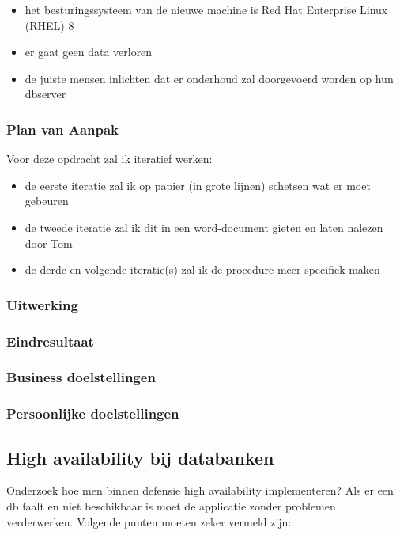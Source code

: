 \begin{itemize}
    \item het besturingssysteem van de nieuwe machine is Red Hat Enterprise Linux (RHEL) 8
    \item er gaat geen data verloren
    \item de juiste mensen inlichten dat er onderhoud zal doorgevoerd worden op hun dbserver
\end{itemize}

\subsubsection{Plan van Aanpak}

Voor deze opdracht zal ik iteratief werken:

\begin{itemize}
    \item de eerste iteratie zal ik op papier (in grote lijnen) schetsen wat er moet gebeuren
    \item de tweede iteratie zal ik dit in een word-document gieten en laten nalezen door Tom
    \item de derde en volgende iteratie(s) zal ik de procedure meer specifiek maken
\end{itemize}

\subsubsection{Uitwerking}
\subsubsection{Eindresultaat}
\subsubsection{Business doelstellingen}
\subsubsection{Persoonlijke doelstellingen}

\subsection{High availability bij databanken}


Onderzoek hoe men binnen defensie high availability implementeren? Als er een db faalt en niet beschikbaar is moet de applicatie zonder problemen verderwerken. Volgende punten moeten zeker vermeld zijn:

